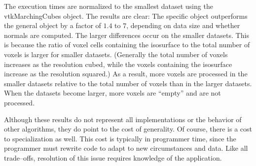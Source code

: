 The execution times are normalized to the smallest dataset using the vtkMarchingCubes object. The results are clear: The specific object outperforms the general object by a factor of $1.4$ to $7$, depending on data size and whether normals are computed. The larger differences occur on the smaller datasets. This is because the ratio of voxel cells containing the isosurface to the total number of voxels is larger for smaller datasets. (Generally the total number of voxels increases as the resolution cubed, while the voxels containing the isosurface increase as the resolution squared.) As a result, more voxels are processed in the smaller datasets relative to the total number of voxels than in the larger datasets. When the datasets become larger, more voxels are ``empty'' and are not processed.

Although these results do not represent all implementations or the behavior of other algorithms, they do point to the cost of generality. Of course, there is a cost to specialization as well. This cost is typically in programmer time, since the programmer must rewrite code to adapt to new circumstances and data. Like all trade--offs, resolution of this issue requires knowledge of the application.

